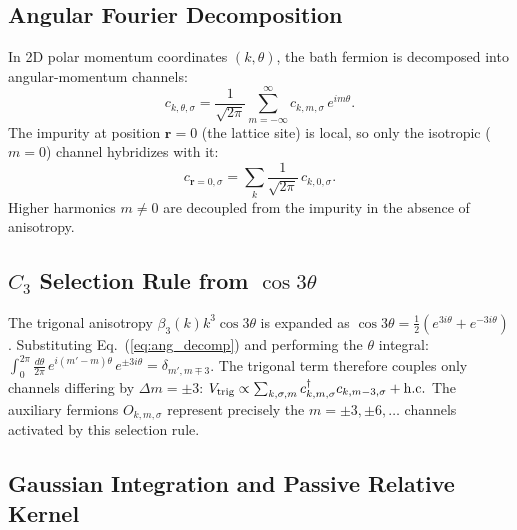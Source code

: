 \documentclass[%
  aps,physrev,onecolumn,10pt,amsmath,amssymb,superscriptaddress,longbibliography,floatfix
]{revtex4-2}
\begin{document}
\subsection{Angular Fourier Decomposition}

In 2D polar momentum coordinates $(k,\theta)$, the bath fermion
is decomposed into angular-momentum channels:
\begin{equation}
c_{k,\theta,\sigma}
=\frac{1}{\sqrt{2\pi}}\sum_{m=-\infty}^{\infty}
c_{k,m,\sigma}\,e^{im\theta}.
\label{eq:ang_decomp}
\end{equation}
The impurity at position $\mathbf{r}=0$ (the lattice site) is local,
so only the isotropic ($m=0$) channel hybridizes with it:
\begin{equation}
c_{\mathbf{r}=0,\sigma}
=\sum_k\frac{1}{\sqrt{2\pi}}\,c_{k,0,\sigma}.
\label{eq:local_bath}
\end{equation}
Higher harmonics $m\neq0$ are decoupled from the impurity in
the absence of anisotropy.

\subsection{\texorpdfstring{$C_3$}{C3} Selection Rule from \texorpdfstring{$\cos3\theta$}{cos(3 theta)}}

The trigonal anisotropy $\beta_3(k)k^3\cos3\theta$ is expanded as $\cos3\theta=\frac{1}{2}(e^{3i\theta}+e^{-3i\theta})$.
Substituting Eq.~(\ref{eq:ang_decomp}) and performing the
$\theta$ integral:
$\int_0^{2\pi}\frac{d\theta}{2\pi}\,e^{i(m'-m)\theta}\,e^{\pm3i\theta}
=\delta_{m',m\mp3}$.
The trigonal term therefore couples only channels differing by
$\Delta m=\pm3$: $V_{\rm trig}\propto\sum_{k,\sigma,m} c^\dagger_{k,m,\sigma}c_{k,m-3,\sigma}+\mathrm{h.c.}$
The auxiliary fermions $O_{k,m,\sigma}$ represent precisely the
$m=\pm3,\pm6,\ldots$ channels activated by this selection rule.

\subsection{Gaussian Integration and Passive Relative Kernel}
\end{document}
